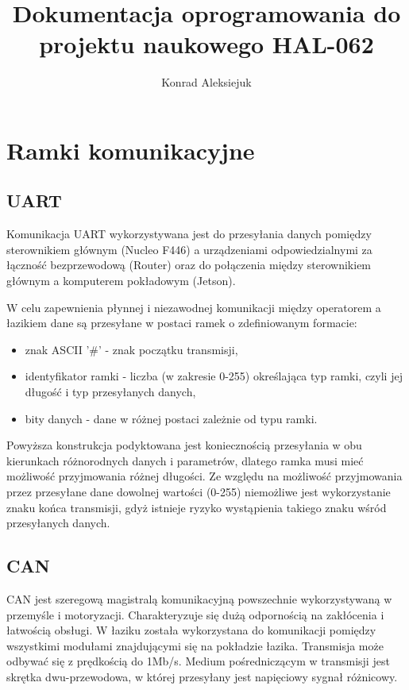 \documentclass{article}
\author{Konrad Aleksiejuk}
\title{Dokumentacja oprogramowania do projektu naukowego HAL-062}
\begin{document}
\maketitle
\tableofcontents

\newpage
\section{Ramki komunikacyjne}
\subsection{UART}
Komunikacja UART wykorzystywana jest do przesyłania danych pomiędzy sterownikiem głównym (Nucleo F446) a urządzeniami odpowiedzialnymi za łączność bezprzewodową (Router) oraz do połączenia między sterownikiem głównym a komputerem pokładowym (Jetson).

W celu zapewnienia płynnej i niezawodnej komunikacji między operatorem a łazikiem dane są przesyłane w postaci ramek o zdefiniowanym formacie:
\begin{itemize}
\item znak ASCII '\#' - znak początku transmisji,
\item identyfikator ramki - liczba (w zakresie 0-255) określająca typ ramki, czyli jej długość i typ przesyłanych danych,
\item bity danych - dane w różnej postaci zależnie od typu ramki.
\end{itemize}

Powyższa konstrukcja podyktowana jest koniecznością przesyłania w obu kierunkach różnorodnych danych i parametrów, dlatego ramka musi mieć możliwość przyjmowania różnej długości. Ze względu na możliwość przyjmowania przez przesyłane dane dowolnej wartości (0-255) niemożliwe jest wykorzystanie znaku końca transmisji, gdyż istnieje ryzyko wystąpienia takiego znaku wśród przesyłanych danych. 

\subsection{CAN}
CAN jest szeregową magistralą komunikacyjną powszechnie wykorzystywaną w przemyśle i motoryzacji. Charakteryzuje się dużą odpornością na zakłócenia i łatwością obsługi. W łaziku została wykorzystana do komunikacji pomiędzy wszystkimi modułami znajdującymi się na pokładzie łazika. Transmisja może odbywać się z prędkością do 1Mb/s. Medium pośredniczącym w transmisji jest skrętka dwu-przewodowa, w której przesyłany jest napięciowy sygnał różnicowy. 
\end{document}
